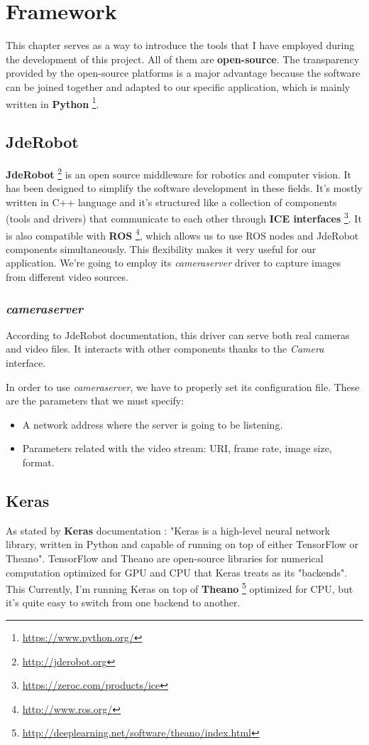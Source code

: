 \chapter{Framework}\label{cap.framework}
This chapter serves as a way to introduce the tools that I have employed during the development of this project. All of them are \textbf{open-source}. The transparency provided by the open-source platforms is a major advantage because the software can be joined together and adapted to our specific application, which is mainly written in \textbf{Python} \footnote{\url{https://www.python.org/}}.

\section{JdeRobot}\label{jderobot}
\textbf{JdeRobot} \footnote{\url{http://jderobot.org}} is an open source middleware for robotics and computer vision. It has been designed to simplify the software development in these fields. It's mostly written in C++ language and it's structured like a collection of components (tools and drivers) that communicate to each other through \textbf{ICE interfaces} \footnote{\url{https://zeroc.com/products/ice}}. It is also compatible with \textbf{ROS} \footnote{\url{http://www.ros.org/}}, which allows us to use ROS nodes and JdeRobot components simultaneously. This flexibility makes it very useful for our application.
We're going to employ its \textit{cameraserver} driver to capture images from different video sources.

\subsection*{\textit{cameraserver}}\label{cameraserver}
According to JdeRobot documentation, this driver can serve both real cameras and video files. It interacts with other components thanks to the \textit{Camera} interface.

In order to use \textit{cameraserver}, we have to properly set its configuration file. These are the parameters that we must specify:
\begin{itemize}
    \item A network address where the server is going to be listening.
    \item Parameters related with the video stream: URI, frame rate, image size, format.
\end{itemize}

\section{Keras}\label{keras}
As stated by \textbf{Keras} documentation \cite{chollet2015keras}: "Keras is a high-level neural network library, written in Python and capable of running on top of either TensorFlow or Theano". TensorFlow and Theano are open-source libraries for numerical computation optimized for GPU and CPU that Keras treats as its "backends". This Currently, I'm running Keras on top of \textbf{Theano} \footnote{\url{http://deeplearning.net/software/theano/index.html}} optimized for CPU, but it's quite easy to switch from one backend to another.

